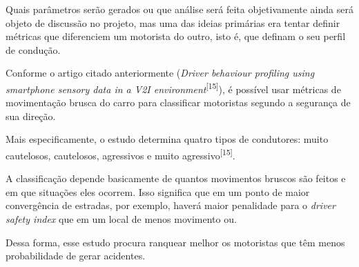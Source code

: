 Quais parâmetros serão gerados ou que análise será feita objetivamente ainda será objeto de discussão no projeto, mas uma das ideias primárias era tentar definir métricas que diferenciem um motorista do outro, isto é, que definam o seu perfil de condução.

Conforme o artigo citado anteriormente (\textit{Driver behaviour profiling using smartphone sensory data in a V2I environment}\textsuperscript{[15]}), é possível usar métricas de movimentação brusca do carro para classificar motoristas segundo a segurança de sua direção.

Mais especificamente, o estudo determina quatro tipos de condutores: muito cautelosos, cautelosos, agressivos e muito agressivo\textsuperscript{[15]}.

A classificação depende basicamente de quantos movimentos bruscos são feitos e em que situações eles ocorrem. Isso significa que em um ponto de maior convergência de estradas, por exemplo, haverá maior penalidade para o \textit{driver safety index} que em um local de menos movimento ou.

Dessa forma, esse estudo procura ranquear melhor os motoristas que têm menos probabilidade de gerar acidentes.
